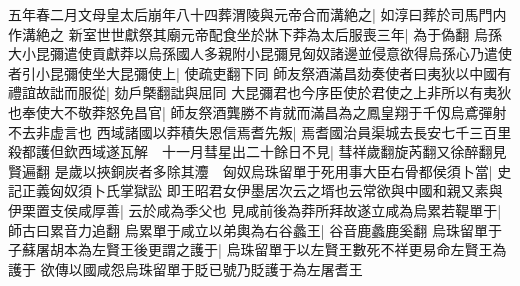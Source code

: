 五年春二月文母皇太后崩年八十四葬渭陵與元帝合而溝絶之|{
	如淳曰葬於司馬門内作溝絶之}
新室世世獻祭其廟元帝配食坐於牀下莽為太后服喪三年|{
	為于偽翻}
烏孫大小昆彌遣使貢獻莽以烏孫國人多親附小昆彌見匈奴諸邊並侵意欲得烏孫心乃遣使者引小昆彌使坐大昆彌使上|{
	使疏吏翻下同}
師友祭酒滿昌劾奏使者曰夷狄以中國有禮誼故詘而服從|{
	劾戶槩翻詘與屈同}
大昆彌君也今序臣使於君使之上非所以有夷狄也奉使大不敬莽怒免昌官|{
	師友祭酒龔勝不肯就而滿昌為之鳳皇翔于千仭烏鳶彈射不去非虚言也}
西域諸國以莽積失恩信焉耆先叛|{
	焉耆國治員渠城去長安七千三百里}
殺都護但欽西域遂瓦解　十一月彗星出二十餘日不見|{
	彗祥歲翻旋芮翻又徐醉翻見賢遍翻}
是歲以挾銅炭者多除其灋　匈奴烏珠留單于死用事大臣右骨都侯須卜當|{
	史記正義匈奴須卜氏掌獄訟}
即王昭君女伊墨居次云之壻也云常欲與中國和親又素與伊栗置支侯咸厚善|{
	云於咸為季父也}
見咸前後為莽所拜故遂立咸為烏累若鞮單于|{
	師古曰累音力追翻}
烏累單于咸立以弟輿為右谷蠡王|{
	谷音鹿蠡鹿奚翻}
烏珠留單于子蘇屠胡本為左賢王後更謂之護于|{
	烏珠留單于以左賢王數死不祥更易命左賢王為護于}
欲傳以國咸怨烏珠留單于貶已號乃貶護于為左屠耆王


